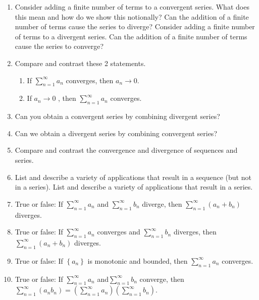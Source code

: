 \begin{enumerate}
\item Consider adding a finite number of terms to a convergent series.  What does this mean and how do we show this notionally?  Can the addition of a finite number of terms cause the series to diverge?  Consider adding a finite number of terms to a divergent series.  Can the addition of a finite number of terms cause the series to converge?

\item Compare and contrast these 2 statements.  \begin{enumerate} \item If $\sum _{n = 1}^\infty  {a_n } $ converges, then $a_n  \to 0$.                       \item If $a_n  \to 0$ , then $\sum _{n = 1}^\infty  {a_n } $ converges.\end{enumerate}

\item Can you obtain a convergent series by combining divergent series?  \cite{EP}

\item Can we obtain a divergent series by combining convergent series?

\item Compare and contrast the convergence and divergence of sequences and series.

\item List and describe a variety of applications that result in a sequence (but not in a series).  List and describe a variety of applications that result in a series.

\item True or false: If $\displaystyle\sum _{n = 1}^\infty  {a_n } $ and $\displaystyle\sum _{n = 1}^\infty  {b_n } $ diverge, then $
\displaystyle\sum _{n = 1}^\infty  {\left( {a_n  + b_n } \right)} $ diverges.

\item True or false: If $
\displaystyle\sum _{n = 1}^\infty  {a_n } $ converges and $\displaystyle\sum _{n = 1}^\infty  {b_n } $ diverges, then $\displaystyle\sum _{n = 1}^\infty  {\left( {a_n  + b_n } \right)} $ diverges.

\item True or false: If $\left\{ {a_n } \right\}$ is monotonic and bounded, then $\displaystyle\sum _{n = 1}^\infty  {a_n } $ converges.

\item True or false: If $\displaystyle\sum _{n = 1}^\infty  {a_n } $ and$\displaystyle\sum _{n = 1}^\infty  {b_n } $ converge, then $\displaystyle\sum\limits_{n = 1}^\infty  {\left( {a_n b_n } \right)}  = \left( {\displaystyle\sum\limits_{n = 1}^\infty  {a_n } } \right)\left( {\displaystyle\sum\limits_{n =1}^\infty  {b_n } } \right)$.


\end{enumerate}
